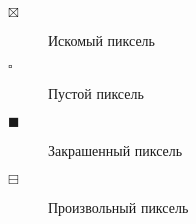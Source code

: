 \Abbreviations %
\begin{description}
\item[$\boxtimes$] Искомый пиксель
\item[$\square$] Пустой пиксель
\item[$\blacksquare$] Закрашенный пиксель
\item[$\boxminus$] Произвольный пиксель
\end{description}


